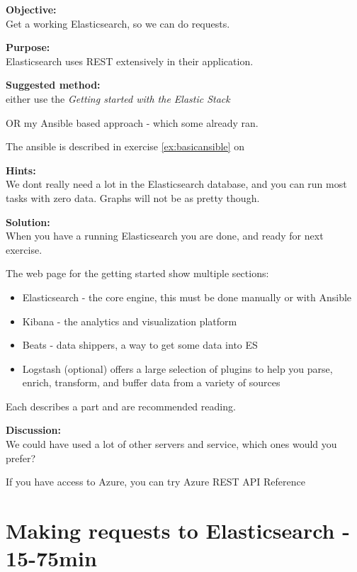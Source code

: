 \documentclass[a4paper,11pt,notitlepage]{report}
\begin{document}

{\bf Objective:}\\
Get a working Elasticsearch, so we can do requests.

{\bf Purpose:}\\
Elasticsearch uses REST extensively in their application.

{\bf Suggested method:}\\
either use the
\emph{Getting started with the Elastic Stack}

OR my Ansible based approach - which some already ran.

The ansible is described in exercise \ref{ex:basicansible} on \pageref{ex:basicansible}

{\bf Hints:}\\
We dont really need a lot in the Elasticsearch database, and you can run most tasks with zero data. Graphs will not be as pretty though.

{\bf Solution:}\\
When you have a running Elasticsearch you are done, and ready for next exercise.

The web page for the getting started show multiple sections:
\begin{itemize}
\item Elasticsearch - the core engine, this must be done manually or with Ansible
\item Kibana - the analytics and visualization platform
\item Beats - data shippers, a way to get some data into ES
\item Logstash (optional) offers a large selection of plugins to help you parse, enrich, transform, and buffer data from a variety of sources
\end{itemize}

Each describes a part and are recommended reading.

{\bf Discussion:}\\
We could have used a lot of other servers and service, which ones would you prefer?

If you have access to Azure, you can try Azure REST API Reference\\ 

\chapter{Making requests to Elasticsearch - 15-75min}
\label{ex:es-rest-api}
\end{document}

